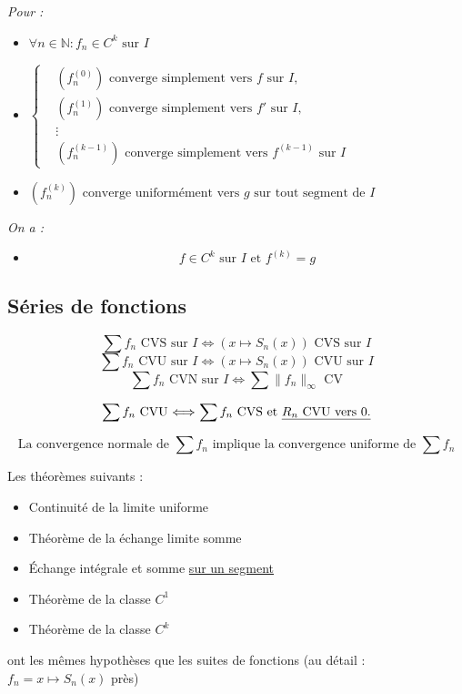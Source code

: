 \documentclass[a4paper,12pt]{report}
\newcommand{\Def}[2]{\begin{tcolorbox}[colback=white,colframe=CornflowerBlue, title=Définition : #1]#2\end{tcolorbox}}
\newcommand{\Thm}[2]{\begin{tcolorbox}[colback=white,colframe=Red!60, title=Théorème : #1]#2\end{tcolorbox}}
\newcommand{\ssi}{\Longleftrightarrow}
\begin{document}
\Thm{De la classe $C^k$}{
\textit{Pour :}
\begin{itemize}
    \item[] \(\forall n \in \mathbb{N} : f_n \in C^k \text{ sur } I\)
    \item[] 
    \(
    \left\{
    \begin{aligned}
        & (f_n^{(0)}) \text{ converge simplement vers } f \text{ sur } I, \\
        & (f_n^{(1)}) \text{ converge simplement vers } f' \text{ sur } I, \\
        & \vdots \\
        & (f_n^{(k-1)}) \text{ converge simplement vers } f^{(k-1)} \text{ sur } I
    \end{aligned}
    \right.
    \)
    \item[] \((f_n^{(k)}) \text{ converge uniformément vers } g \text{ sur tout segment de } I\)
\end{itemize}

\textit{On a :}
\begin{itemize}
    \item[] \[f \in C^k \text{ sur } I \text{ et } f^{(k)} = g\]
\end{itemize}
}

\subsection{Séries de fonctions}

\Def{3 modes de convergence (Séries de fonctions)}{
\[\sum f_n \text{ CVS sur $I$} \ssi (x \longmapsto S_n(x) ) \text{ CVS sur $I$}\]
\[\sum f_n \text{ CVU sur $I$} \ssi  (x \longmapsto S_n(x) ) \text{ CVU sur $I$}\]
\[\sum f_n \text{ CVN sur $I$} \ssi \sum \lVert f_n \rVert_{\infty} \text{ CV}\]
}

\Thm{Convergence uniforme : meilleure approche avec TSSA}{
 \[\text{$\sum f_n$ CVU $\ssi$ $\sum f_n$ CVS et \underline{$R_n$ CVU vers 0.}}\]
}

\Thm{CVN $\implies$ CVU}{
\[\text{La convergence normale de $\sum f_n$ implique la convergence uniforme de $\sum f_n$}\]
}

\Thm{}{

Les théorèmes suivants : 
\begin{itemize}
\item[] Continuité de la limite uniforme
\item[] Théorème de la échange limite somme
\item[] Échange intégrale et somme \underline{sur un segment}
\item[] Théorème de la classe $C^1$
\item[] Théorème de la classe $C^k$
\end{itemize}
ont les mêmes hypothèses que les suites de fonctions (au détail : $f_n = x\longmapsto S_n(x)$ près)
}
\end{document}

